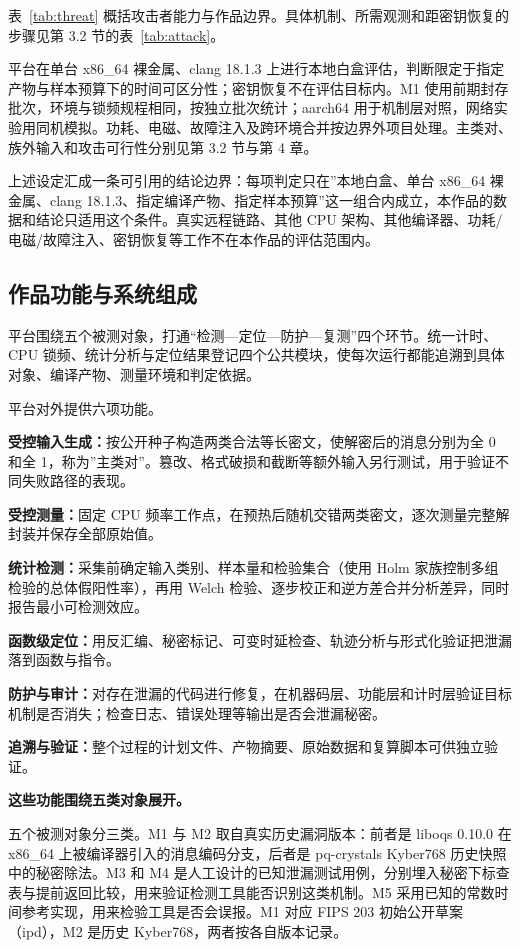 表~\ref{tab:threat} 概括攻击者能力与作品边界。具体机制、所需观测和距密钥恢复的步骤见第 3.2 节的表~\ref{tab:attack}。

平台在单台 x86\_64 裸金属、clang 18.1.3 上进行本地白盒评估，判断限定于指定产物与样本预算下的时间可区分性；密钥恢复不在评估目标内。M1 使用前期封存批次，环境与锁频规程相同，按独立批次统计；aarch64 用于机制层对照，网络实验用同机模拟。功耗、电磁、故障注入及跨环境合并按边界外项目处理。主类对、族外输入和攻击可行性分别见第 3.2 节与第 4 章。

上述设定汇成一条可引用的结论边界：每项判定只在”本地白盒、单台 x86\_64 裸金属、clang 18.1.3、指定编译产物、指定样本预算”这一组合内成立，本作品的数据和结论只适用这个条件。真实远程链路、其他 CPU 架构、其他编译器、功耗/电磁/故障注入、密钥恢复等工作不在本作品的评估范围内。

\subsection{作品功能与系统组成}

平台围绕五个被测对象，打通“检测—定位—防护—复测”四个环节。统一计时、CPU 锁频、统计分析与定位结果登记四个公共模块，使每次运行都能追溯到具体对象、编译产物、测量环境和判定依据。

平台对外提供六项功能。

\textbf{受控输入生成：}按公开种子构造两类合法等长密文，使解密后的消息分别为全 0 和全 1，称为”主类对”。篡改、格式破损和截断等额外输入另行测试，用于验证不同失败路径的表现。

\textbf{受控测量：}固定 CPU 频率工作点，在预热后随机交错两类密文，逐次测量完整解封装并保存全部原始值。

\textbf{统计检测：}采集前确定输入类别、样本量和检验集合（使用 Holm 家族控制多组检验的总体假阳性率），再用 Welch 检验、逐步校正和逆方差合并分析差异，同时报告最小可检测效应。

\textbf{函数级定位：}用反汇编、秘密标记、可变时延检查、轨迹分析与形式化验证把泄漏落到函数与指令。

\textbf{防护与审计：}对存在泄漏的代码进行修复，在机器码层、功能层和计时层验证目标机制是否消失；检查日志、错误处理等输出是否会泄漏秘密。

\textbf{追溯与验证：}整个过程的计划文件、产物摘要、原始数据和复算脚本可供独立验证。

\textbf{这些功能围绕五类对象展开。}

五个被测对象分三类。M1 与 M2 取自真实历史漏洞版本：前者是 liboqs 0.10.0 在 x86\_64 上被编译器引入的消息编码分支，后者是 pq-crystals Kyber768 历史快照中的秘密除法。M3 和 M4 是人工设计的已知泄漏测试用例，分别埋入秘密下标查表与提前返回比较，用来验证检测工具能否识别这类机制。M5 采用已知的常数时间参考实现，用来检验工具是否会误报。M1 对应 FIPS 203 初始公开草案（ipd），M2 是历史 Kyber768，两者按各自版本记录。

